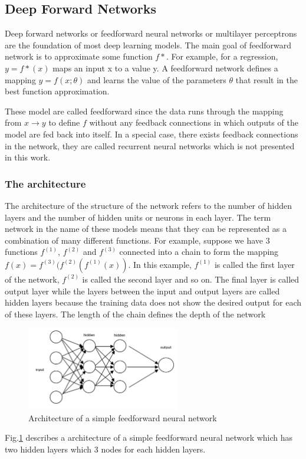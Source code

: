 \subsection{Deep Forward Networks}
\hspace{0.5cm} Deep forward networks or feedforward neural networks or multilayer perceptrons are the foundation of most deep learning models. The main goal of feedforward network is to approximate some function $f*$. For example, for a regression, $y = f*(x)$ maps an input x to a value y. A feedforward network defines a mapping $y = f(x;\theta)$ and learns the value of the parameters $\theta$ that result in the best function approximation.\par
These model are called feedforward since the data runs through the mapping from $x \rightarrow y$ to define $f$ without any feedback connections in which outputs of the model are fed back into itself. In a special case, there exists feedback connections in the network, they are called recurrent neural networks which is not presented in this work.
\pagebreak
\subsubsection{The architecture}
\hspace{0.5cm} The architecture of the structure of the network refers to the number of hidden layers and the number of hidden units or neurons in each layer. The term network in the name of these models means that they can be represented as a combination of many different functions. For example, suppose we have 3 functions $f^{(1)}$, $f^{(2)}$ and $f^{(3)}$ connected into a chain to form the mapping $f(x) = f^{(3)}(f^{(2)}(f^{(1)}(x))$. In this example, $f^{(1)}$ is called the first layer of the network, $f^{(2)}$ is called the second layer and so on. The final layer is called output layer while the layers between the input and output layers are called hidden layers because the training data does not show the desired output for each of these layers. The length of the chain defines the depth of the network
\begin{figure}[h!]
    \centering
    \includegraphics[width=0.6\textwidth]{Chapters/Fig/architecture_mlp.png}
    \caption{Architecture of a simple feedforward neural network}
    \label{fig:arch_mlp}
\end{figure}
\par Fig.\ref{fig:arch_mlp} describes a architecture of a simple feedforward neural network which has two hidden layers which 3 nodes for each hidden layers.






